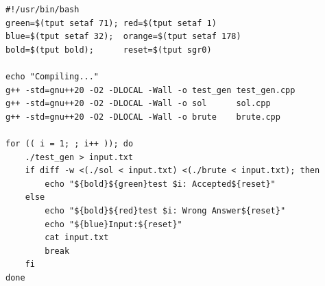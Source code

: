 \begin{lstlisting}
#!/usr/bin/bash
green=$(tput setaf 71); red=$(tput setaf 1)
blue=$(tput setaf 32);  orange=$(tput setaf 178)
bold=$(tput bold);      reset=$(tput sgr0)

echo "Compiling..."
g++ -std=gnu++20 -O2 -DLOCAL -Wall -o test_gen test_gen.cpp
g++ -std=gnu++20 -O2 -DLOCAL -Wall -o sol      sol.cpp
g++ -std=gnu++20 -O2 -DLOCAL -Wall -o brute    brute.cpp

for (( i = 1; ; i++ )); do
    ./test_gen > input.txt
    if diff -w <(./sol < input.txt) <(./brute < input.txt); then
        echo "${bold}${green}test $i: Accepted${reset}"
    else
        echo "${bold}${red}test $i: Wrong Answer${reset}"
        echo "${blue}Input:${reset}"
        cat input.txt
        break
    fi
done
\end{lstlisting}
